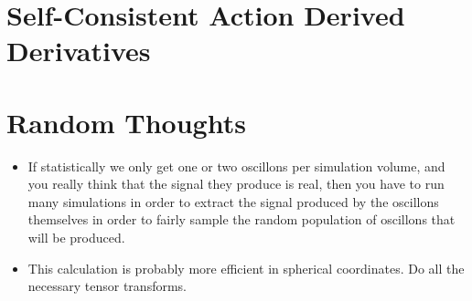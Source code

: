 \documentclass{revtex4}
\begin{document}
\section{Self-Consistent Action Derived Derivatives}


\section{Random Thoughts}
\begin{itemize}
\item If statistically we only get one or two oscillons per simulation volume, and you really think that the signal they produce is real, then you have to run many simulations in order to extract the signal produced by the oscillons themselves in order to fairly sample the random population of oscillons that will be produced.
\item This calculation is probably more efficient in spherical coordinates.  Do all the necessary tensor transforms.
\end{itemize}
\end{document}
